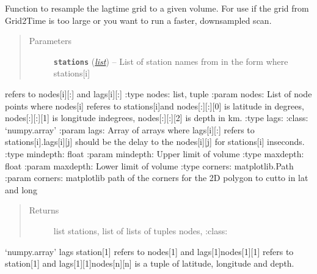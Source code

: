\documentclass[a4paper,10pt,english]{sphinxmanual}
\begin{document}

\begin{fulllineitems}
\label{submodules/core.bright_lights:bright_lights._resample_grid}
Function to resample the lagtime grid to a given volume.  For use if the
grid from Grid2Time is too large or you want to run a faster, downsampled
scan.
\begin{quote}\begin{description}
\item[{Parameters}] \leavevmode
\textbf{\texttt{stations}} (\href{https://docs.python.org/library/functions.html\#list}{\emph{list}}) -- List of station names from in the form where stations{[}i{]}

\end{description}\end{quote}

refers to nodes{[}i{]}{[}:{]} and lags{[}i{]}{[}:{]}
:type nodes: list, tuple
:param nodes: List of node points where nodes{[}i{]} referes to stations{[}i{]}and nodes{[}:{]}{[}:{]}{[}0{]} is latitude in degrees, nodes{[}:{]}{[}:{]}{[}1{]} is longitude indegrees, nodes{[}:{]}{[}:{]}{[}2{]} is depth in km.
:type lags: :class: `numpy.array'
:param lags: Array of arrays where lags{[}i{]}{[}:{]} refers to stations{[}i{]}.lags{[}i{]}{[}j{]} should be the delay to the nodes{[}i{]}{[}j{]} for stations{[}i{]} inseconds.
:type mindepth: float
:param mindepth: Upper limit of volume
:type maxdepth: float
:param maxdepth: Lower limit of volume
:type corners: matplotlib.Path
:param corners: matplotlib path of the corners for the 2D polygon to cutto in lat and long
\begin{quote}\begin{description}
\item[{Returns}] \leavevmode
list stations, list of lists of tuples nodes, :class: 

\end{description}\end{quote}

`numpy.array' lags station{[}1{]} refers to nodes{[}1{]} and lags{[}1{]}nodes{[}1{]}{[}1{]} refers to station{[}1{]} and lags{[}1{]}{[}1{]}nodes{[}n{]}{[}n{]} is a tuple of latitude, longitude and depth.

\end{fulllineitems}
\end{document}
